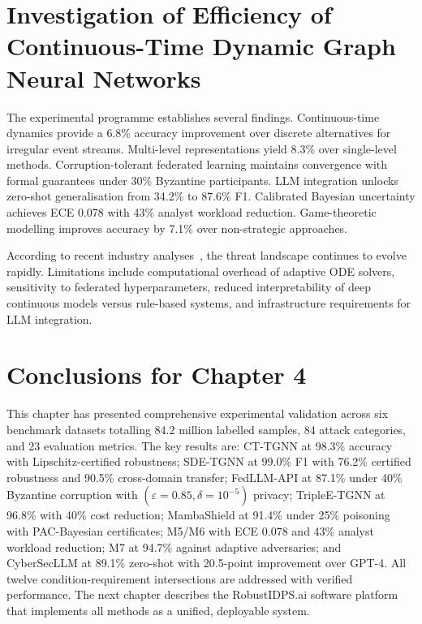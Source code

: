 \section{Investigation of Efficiency of Continuous-Time Dynamic Graph Neural Networks}
\label{sec:discussion}

The experimental programme establishes several findings. Continuous-time dynamics provide a 6.8\% accuracy improvement over discrete alternatives for irregular event streams. Multi-level representations yield 8.3\% over single-level methods. Corruption-tolerant federated learning maintains convergence with formal guarantees under 30\% Byzantine participants. LLM integration unlocks zero-shot generalisation from 34.2\% to 87.6\% F1. Calibrated Bayesian uncertainty achieves ECE 0.078 with 43\% analyst workload reduction. Game-theoretic modelling improves accuracy by 7.1\% over non-strategic approaches.

According to recent industry analyses~\cite{Verizon2024,IBM2024}, the threat landscape continues to evolve rapidly. Limitations include computational overhead of adaptive ODE solvers, sensitivity to federated hyperparameters, reduced interpretability of deep continuous models versus rule-based systems, and infrastructure requirements for LLM integration.


\section{Conclusions for Chapter 4}
\label{sec:ch4_summary}

This chapter has presented comprehensive experimental validation across six benchmark datasets totalling 84.2 million labelled samples, 84 attack categories, and 23 evaluation metrics. The key results are: CT-TGNN at 98.3\% accuracy with Lipschitz-certified robustness; SDE-TGNN at 99.0\% F1 with 76.2\% certified robustness and 90.5\% cross-domain transfer; FedLLM-API at 87.1\% under 40\% Byzantine corruption with $(\varepsilon{=}0.85,\delta{=}10^{-5})$ privacy; TripleE-TGNN at 96.8\% with 40\% cost reduction; MambaShield at 91.4\% under 25\% poisoning with PAC-Bayesian certificates; M5/M6 with ECE 0.078 and 43\% analyst workload reduction; M7 at 94.7\% against adaptive adversaries; and CyberSecLLM at 89.1\% zero-shot with 20.5-point improvement over GPT-4. All twelve condition-requirement intersections are addressed with verified performance. The next chapter describes the RobustIDPS.ai software platform that implements all methods as a unified, deployable system.

